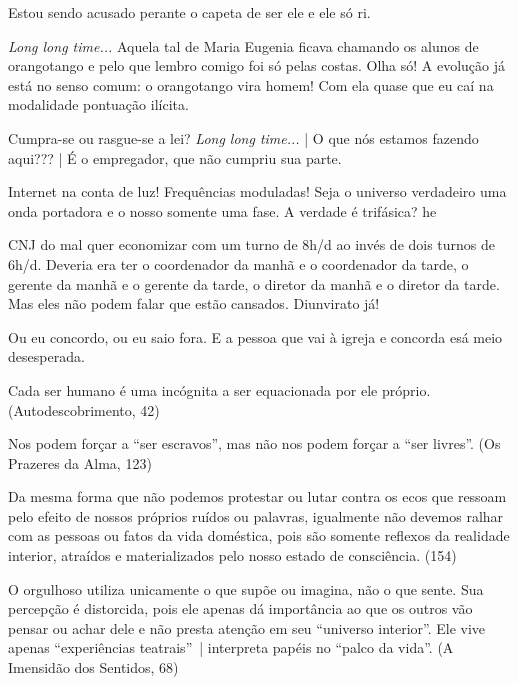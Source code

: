 \documentclass[12pt,a4paper]{article}
\begin{document}
			Estou sendo acusado perante o capeta de ser ele e ele s\'o ri.

			\emph{Long long time...} Aquela tal de Maria Eugenia ficava chamando os alunos de orangotango e pelo que lembro comigo foi s\'o pelas costas. Olha s\'o! A evolu\c{c}\~ao j\'a est\'a no senso comum: o orangotango vira homem! Com ela quase que eu ca\'i na modalidade pontua\c{c}\~ao il\'icita.

			Cumpra-se ou rasgue-se a lei? \emph{Long long time...} | O que n\'os estamos fazendo aqui??? | \'E o empregador, que n\~ao cumpriu sua parte.

			Internet na conta de luz! Frequ\^encias moduladas! Seja o universo verdadeiro uma onda portadora e o nosso somente uma fase. A verdade \'e trif\'asica? he

			CNJ do mal quer economizar com um turno de 8h/d ao inv\'es de dois turnos de 6h/d. Deveria era ter o coordenador da manh\~a e o coordenador da tarde, o gerente da manh\~a e o gerente da tarde, o diretor da manh\~a e o diretor da tarde. Mas eles n\~ao podem falar que est\~ao cansados. Diunvirato j\'a!

			Ou eu concordo, ou eu saio fora. E a pessoa que vai \`a igreja e concorda es\'a meio desesperada.

			\begin{flushright}
			\end{flushright}

			Cada ser humano \'e uma inc\'ognita a ser equacionada por ele pr\'oprio. (Autodescobrimento, 42)

			Nos podem for\c{c}ar a \textquotedblleft ser escravos\textquotedblright, mas n\~ao nos podem for\c{c}ar a \textquotedblleft ser livres\textquotedblright. (Os Prazeres da Alma, 123)

			Da mesma forma que n\~ao podemos protestar ou lutar contra os ecos que ressoam pelo efeito de nossos pr\'oprios ru\'idos ou palavras, igualmente n\~ao devemos ralhar com as pessoas ou fatos da vida dom\'estica, pois s\~ao somente reflexos da realidade interior, atra\'idos e materializados pelo nosso estado de consci\^encia. (154)

			O orgulhoso utiliza unicamente o que sup\~oe ou imagina, n\~ao o que sente. Sua percep\c{c}\~ao \'e distorcida, pois ele apenas d\'a import\^ancia ao que os outros v\~ao pensar ou achar dele e n\~ao presta aten\c{c}\~ao em seu \textquotedblleft universo interior\textquotedblright. Ele vive apenas \textquotedblleft experi\^encias teatrais\textquotedblright\, | interpreta pap\'eis no \textquotedblleft palco da vida\textquotedblright. (A Imensid\~ao dos Sentidos, 68)
\end{document}
